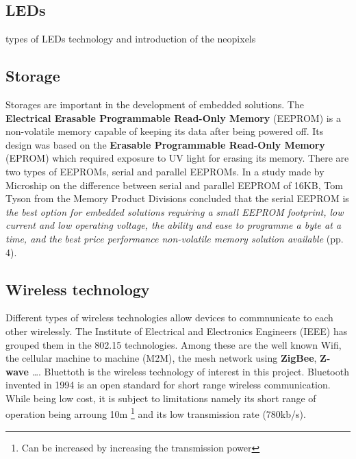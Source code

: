 
\subsection{LEDs}
types of LEDs technology and introduction of the neopixels
\subsection{Storage}
Storages are important in the development of embedded solutions. The \textbf{Electrical Erasable Programmable Read-Only Memory} (EEPROM) is a non-volatile memory capable of keeping its data after being powered off. Its design was based on the \textbf{Erasable Programmable Read-Only Memory} (EPROM) which required exposure to UV light for erasing its memory. There are two types of EEPROMs, serial and parallel EEPROMs. In a study made by Microship on the difference between serial and parallel EEPROM of 16KB, Tom Tyson from the Memory Product Divisions concluded that the serial EEPROM is \textit{the best option for embedded solutions requiring a small EEPROM footprint, low current and low operating voltage, the ability and ease to programme a byte at a time, and the best price performance non-volatile memory solution available}\cite{serialvsparallel} (pp. 4).


\subsection{Wireless technology}
Different types of wireless technologies allow devices to commnunicate to each other wirelessly. The Institute of Electrical and Electronics Engineers (IEEE) has grouped them in the 802.15 technologies. Among these are the well known Wifi, the cellular machine to machine (M2M), the mesh network using \textbf{ZigBee}, \textbf{Z-wave} \ldots . Bluettoth is the wireless technology of interest in this project. Bluetooth invented in 1994 is an open standard for short range wireless communication. While being low cost, it is subject to limitations namely its short range of operation being arroung 10m \footnote{Can be increased by increasing the transmission power} and its low transmission rate (780kb/s). 

